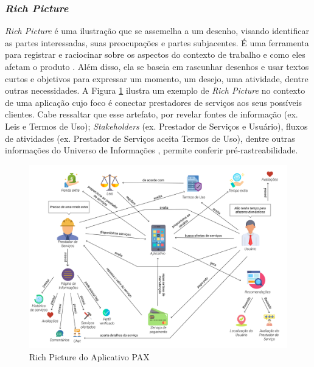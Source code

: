 \subsubsection{\textit{Rich Picture}}

\label{sec:rich_picture}

\textit{Rich Picture} é uma ilustração que se assemelha a um desenho, visando identificar as partes interessadas, suas preocupações e partes subjacentes. É uma ferramenta para registrar e raciocinar sobre os aspectos do contexto de trabalho e como eles afetam o produto  \cite{10.1145/274430.274434}. Além disso, ela se baseia em rascunhar desenhos e usar textos curtos e objetivos para expressar um momento, um desejo, uma atividade, dentre outras necessidades. A Figura \ref{fig:rich_picture} ilustra um exemplo de \textit{Rich Picture} no contexto de uma aplicação cujo foco é conectar prestadores de serviços aos seus possíveis clientes. Cabe ressaltar que esse artefato, por revelar fontes de informação (ex. Leis e Termos de Uso); \textit{Stakeholders} (ex. Prestador de Serviços e Usuário), fluxos de atividades (ex. Prestador de Serviços aceita Termos de Uso), dentre outras informações do Universo de Informações \cite{leite2007livro}, permite conferir pré-rastreabilidade.

\begin{figure}[htb]
    \begin{center}
        \caption{Rich Picture do Aplicativo PAX}
        \label{fig:rich_picture}
        \includegraphics[scale=0.31]{figuras/Embasamento/rp_geral_v3.png}
    \end{center}
\end{figure}

